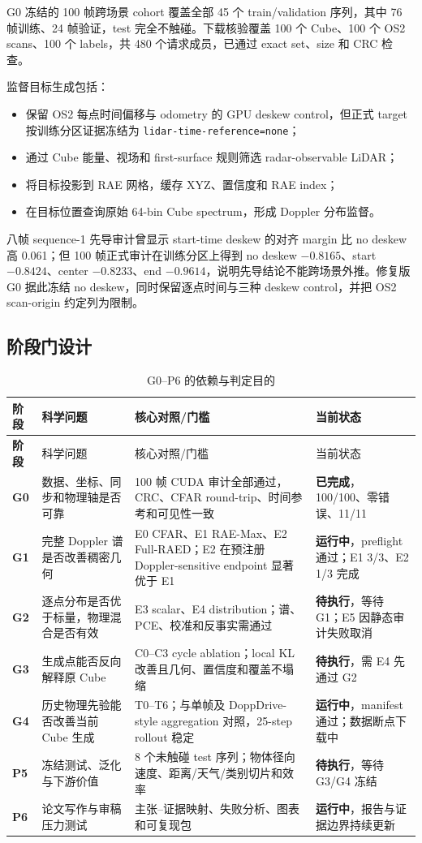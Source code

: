\documentclass[11pt,a4paper,fontset=none]{ctexart}
\newcommand{\statusdone}{\textcolor{FlowGreen}{\textbf{已完成}}}
\newcommand{\statusrun}{\textcolor{FlowOrange}{\textbf{运行中}}}
\newcommand{\statuswait}{\textcolor{FlowGray}{\textbf{待执行}}}
\newcommand{\code}[1]{\texttt{#1}}
\begin{document}
G0 冻结的 100 帧跨场景 cohort 覆盖全部 45 个 train/validation 序列，其中 76 帧训练、24 帧验证，test 完全不触碰。下载核验覆盖 100 个 Cube、100 个 OS2 scans、100 个 labels，共 480 个请求成员，已通过 exact set、size 和 CRC 检查。

监督目标生成包括：
\begin{itemize}
  \item 保留 OS2 每点时间偏移与 odometry 的 GPU deskew control，但正式 target 按训练分区证据冻结为 \code{lidar-time-reference=none}；
  \item 通过 Cube 能量、视场和 first-surface 规则筛选 radar-observable LiDAR；
  \item 将目标投影到 RAE 网格，缓存 XYZ、置信度和 RAE index；
  \item 在目标位置查询原始 64-bin Cube spectrum，形成 Doppler 分布监督。
\end{itemize}
八帧 sequence-1 先导审计曾显示 start-time deskew 的对齐 margin 比 no deskew 高 0.061；但 100 帧正式审计在训练分区上得到 no deskew $-0.8165$、start $-0.8424$、center $-0.8233$、end $-0.9614$，说明先导结论不能跨场景外推。修复版 G0 据此冻结 no deskew，同时保留逐点时间与三种 deskew control，并把 OS2 scan-origin 约定列为限制。

\subsection{阶段门设计}

\begin{longtable}{>{\bfseries}p{1.3cm} p{3.2cm} p{5.3cm} p{4.1cm}}
\caption{G0--P6 的依赖与判定目的}\\
\toprule
阶段 & 科学问题 & 核心对照/门槛 & 当前状态 \\
\midrule
\endfirsthead
\toprule
阶段 & 科学问题 & 核心对照/门槛 & 当前状态 \\
\midrule
\endhead
G0 & 数据、坐标、同步和物理轴是否可靠 & 100 帧 CUDA 审计全部通过，CRC、CFAR round-trip、时间参考和可见性一致 & \statusdone，100/100、零错误、11/11 \\
G1 & 完整 Doppler 谱是否改善稠密几何 & E0 CFAR、E1 RAE-Max、E2 Full-RAED；E2 在预注册 Doppler-sensitive endpoint 显著优于 E1 & \statusrun，preflight 通过；E1 3/3、E2 1/3 完成 \\
G2 & 逐点分布是否优于标量，物理混合是否有效 & E3 scalar、E4 distribution；谱、PCE、校准和反事实需通过 & \statuswait，等待 G1；E5 因静态审计失败取消 \\
G3 & 生成点能否反向解释原 Cube & C0--C3 cycle ablation；local KL 改善且几何、置信度和覆盖不塌缩 & \statuswait，需 E4 先通过 G2 \\
G4 & 历史物理先验能否改善当前 Cube 生成 & T0--T6；与单帧及 DoppDrive-style aggregation 对照，25-step rollout 稳定 & \statusrun，manifest 通过；数据断点下载中 \\
P5 & 冻结测试、泛化与下游价值 & 8 个未触碰 test 序列；物体径向速度、距离/天气/类别切片和效率 & \statuswait，等待 G3/G4 冻结 \\
P6 & 论文写作与审稿压力测试 & 主张--证据映射、失败分析、图表和可复现包 & \statusrun，报告与证据边界持续更新 \\
\bottomrule
\end{longtable}
\end{document}

